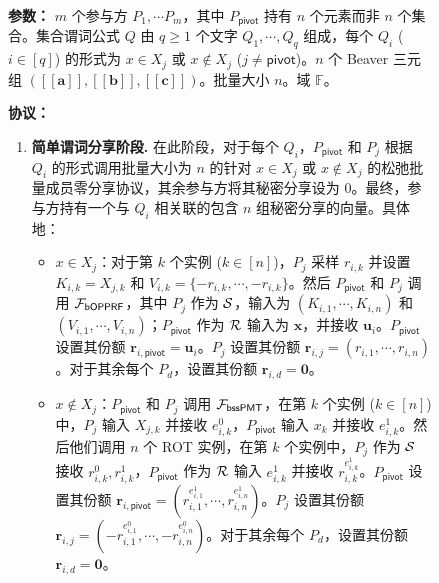 \begin{figure}[!htb]
\begin{framed}
\begin{minipage}[c]{\textwidth}
\begin{trivlist}
\item \textbf{参数：} $m$ 个参与方 $P_1, \cdots P_m$，其中 $P_\mathsf{pivot}$ 持有 $n$ 个元素而非 $n$ 个集合。集合谓词公式 $Q$ 由 $q \ge 1$ 个文字 $Q_1,\cdots,Q_q$ 组成，每个 $Q_i$ ($i \in [q]$) 的形式为 $x \in X_j$ 或 $x \notin X_j$ ($j \ne \mathsf{pivot}$)。$n$ 个 Beaver 三元组 $([\! [ \textbf{a} ] \!], [\! [ \textbf{b} ] \!], [\! [ \textbf{c} ] \!])$。批量大小 $n$。域 $\mathbb{F}$。 
\item \textbf{协议：}
\begin{enumerate}[itemsep=2pt,topsep=0pt,parsep=0pt,leftmargin=10pt]
\item \textbf{简单谓词分享阶段.} 在此阶段，对于每个 $Q_i$，$P_\mathsf{pivot}$ 和 $P_j$ 根据 $Q_i$ 的形式调用批量大小为 $n$ 的针对 $x \in X_j$ 或 $x \notin X_j$ 的松弛批量成员零分享协议，其余参与方将其秘密分享设为 0。最终，参与方持有一个与 $Q_i$ 相关联的包含 $n$ 组秘密分享的向量。具体地：
    \begin{itemize}
        \item $x \in X_j$：对于第 $k$ 个实例 ($k \in [n]$)，$P_j$ 采样 $r_{i,k}$ 并设置 $K_{i,k} = X_{j,k}$ 和 $V_{i,k} = \{-r_{i,k}, \cdots, -r_{i,k}\}$。然后 $P_\mathsf{pivot}$ 和 $P_j$ 调用 $\mathcal{F}_\mathsf{bOPPRF}$，其中 $P_j$ 作为 $\mathcal{S}$，输入为 $(K_{i,1},\cdots,K_{i,n})$ 和 $(V_{i,1},\cdots,V_{i,n})$；$P_\mathsf{pivot}$ 作为 $\mathcal{R}$ 输入为 $\textbf{x}$，并接收 $\textbf{u}_{i}$。$P_\mathsf{pivot}$ 设置其份额 $\textbf{r}_{i,\mathsf{pivot}} = \textbf{u}_{i}$。$P_j$ 设置其份额 $\textbf{r}_{i,j} = (r_{i,1}, \cdots, r_{i,n})$。对于其余每个 $P_{d}$，设置其份额 $\textbf{r}_{i,d} = \textbf{0}$。 
        \item $x \notin X_j$：$P_\mathsf{pivot}$ 和 $P_j$ 调用 $\mathcal{F}_\mathsf{bssPMT}$，在第 $k$ 个实例 ($k \in [n]$) 中，$P_j$ 输入 $X_{j,k}$ 并接收 $e_{i,k}^0$，$P_\mathsf{pivot}$ 输入 $x_k$ 并接收 $e_{i,k}^1$。然后他们调用 $n$ 个 ROT 实例，在第 $k$ 个实例中，$P_j$ 作为 $\mathcal{S}$ 接收 $r_{i,k}^0,r_{i,k}^1$，$P_\mathsf{pivot}$ 作为 $\mathcal{R}$ 输入 $e_{i,k}^1$ 并接收 $r_{i,k}^{e_{i,k}^1}$。$P_\mathsf{pivot}$ 设置其份额 $\textbf{r}_{i,\mathsf{pivot}} = (r_{i,1}^{e_{i,1}^1},\cdots,r_{i,n}^{e_{i,n}^1})$。$P_j$ 设置其份额 $\textbf{r}_{i,j} = (-r_{i,1}^{e_{i,1}^0}, \cdots, -r_{i,n}^{e_{i,n}^0})$。对于其余每个 $P_{d}$，设置其份额 $\textbf{r}_{i,d} = \textbf{0}$。 
    \end{itemize}

\end{enumerate}
\end{trivlist}
\end{minipage}
\end{framed}
\end{figure}
